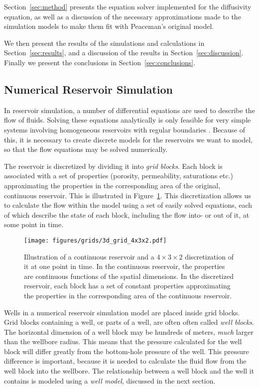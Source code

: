 Section~\ref{sec:method} presents the equation solver implemented for the diffusivity equation, as well as a discussion of the necessary approximations made to the simulation models to make them fit with Peaceman's original model.

We then present the results of the simulations and calculations in Section~\ref{sec:results}, and a discussion of the results in Section~\ref{sec:discussion}. Finally we present the conclusions in Section~\ref{sec:conclusions}.

\subsection{Numerical Reservoir Simulation} %
\label{sub:numerical_reservoir_simulation}
In reservoir simulation, a number of differential equations are used to describe the flow of fluids. Solving these equations analytically is only feasible for very simple systems involving homogeneous reservoirs with regular boundaries \cite{Peaceman1977Fundamentals}. Because of this, it is necessary to create discrete models for the reservoirs we want to model, so that the flow equations may be solved numerically.

The reservoir is discretized by dividing it into \emph{grid blocks}. Each block is associated with a set of properties (porosity, permeability, saturations etc.) approximating the properties in the corresponding area of the original, continuous reservoir. This is illustrated in Figure~\ref{fig:grid-discretization}. This discretization allows us to calculate the flow within the model using a set of easily solved equations, each of which describe the state of each block, including the flow into- or out of it, at some point in time.

\begin{figure}[htbp]
    \centering
    \texttt{[image: figures/grids/3d\_grid\_4x3x2.pdf]}
    \caption{Illustration of a continuous reservoir and a $4\times 3\times 2$ discretization of it at one point in time. In the continuous reservoir, the properties are continuous functions of the spatial dimensions. In the discretized reservoir, each block has a set of constant properties approximating the properties in the corresponding area of the continuous reservoir.}
    \label{fig:grid-discretization}
\end{figure}


Wells in a numerical reservoir simulation model are placed inside grid blocks. Grid blocks containing a well, or parts of a well, are often often called \emph{well blocks}. The horizontal dimension of a well block may be hundreds of meters, \emph{much} larger than the wellbore radius. This means that the pressure calculated for the well block will differ greatly from the bottom-hole pressure of the well. This pressure difference is important, because it is needed to calculate the fluid flow  from the well block into the wellbore. The relationship between a well block and the well it contains is modeled using a \emph{well model}, discussed in the next section.

